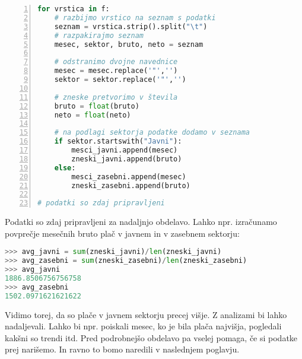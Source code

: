 \begin{resitev}
\begin{lstlisting}[language=Python, showstringspaces=false,numbers=left]
for vrstica in f:
    # razbijmo vrstico na seznam s podatki
    seznam = vrstica.strip().split("\t")
    # razpakirajmo seznam
    mesec, sektor, bruto, neto = seznam

    # odstranimo dvojne navednice
    mesec = mesec.replace('"','')
    sektor = sektor.replace('"','')

    # zneske pretvorimo v števila
    bruto = float(bruto)
    neto = float(neto)

    # na podlagi sektorja podatke dodamo v seznama
    if sektor.startswith("Javni"):
        mesci_javni.append(mesec)
        zneski_javni.append(bruto)
    else:
        mesci_zasebni.append(mesec)
        zneski_zasebni.append(bruto)

# podatki so zdaj pripravljeni
\end{lstlisting}
\end{resitev}

Podatki so zdaj pripravljeni za nadaljnjo obdelavo. Lahko npr. izračunamo povprečje mesečnih bruto plač v javnem in v zasebnem sektorju:
\begin{lstlisting}[language=Python, showstringspaces=false]
>>> avg_javni = sum(zneski_javni)/len(zneski_javni)
>>> avg_zasebni = sum(zneski_zasebni)/len(zneski_zasebni)
>>> avg_javni
1886.8506756756758
>>> avg_zasebni
1502.0971621621622
\end{lstlisting}

Vidimo torej, da so plače v javnem sektorju precej višje. Z analizami bi lahko nadaljevali. Lahko bi npr. poiskali mesec, ko je bila plača najvišja, pogledali kakšni so trendi itd. Pred podrobnejšo obdelavo pa vselej pomaga, če si podatke prej narišemo. In ravno to bomo naredili v naslednjem poglavju.
